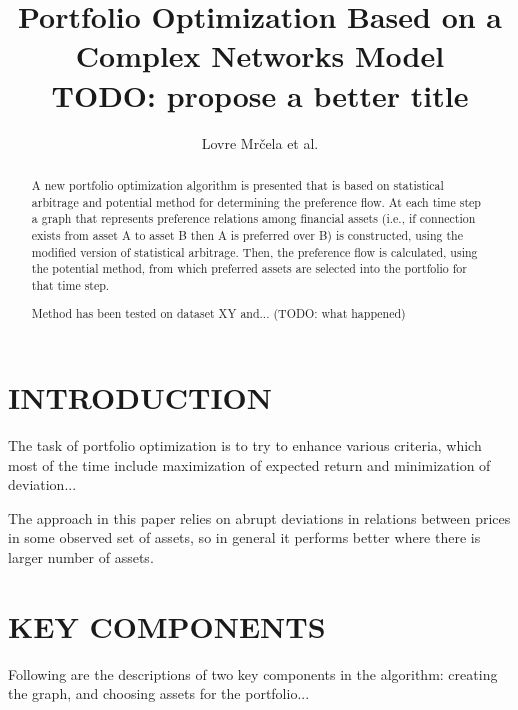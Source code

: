 \documentclass[letterpaper, 10 pt, conference]{ieeeconf}
\title{\LARGE \bf Portfolio Optimization Based on a Complex Networks Model\\TODO: propose a better title}
\author{Lovre Mr\v{c}ela et al.}
\begin{document}
  \maketitle
  \thispagestyle{empty}
  \pagestyle{empty}
    
  \begin{abstract}
    
  A new portfolio optimization algorithm is presented that is based on statistical arbitrage and potential method for determining the preference flow.
  At each time step a graph that represents preference relations among financial assets (i.e., if connection exists from asset A to asset B then A is preferred over B) is constructed, using the modified version of statistical arbitrage.
  Then, the preference flow is calculated, using the potential method\cite{caklovic}, from which preferred assets are selected into the portfolio for that time step.
  
  Method has been tested on dataset XY and... (TODO: what happened)
  
  \end{abstract}
  
  \section{INTRODUCTION}
  
  The task of portfolio optimization is to try to enhance various criteria, which most of the time include maximization of expected return and minimization of deviation...
  
  The approach in this paper relies on abrupt deviations in relations between prices in some observed set of assets, so in general it performs better where there is larger number of assets.
  
  
  
  \section{KEY COMPONENTS}
  
  Following are the descriptions of two key components in the algorithm: creating the graph, and choosing assets for the portfolio...
    
\end{document}
